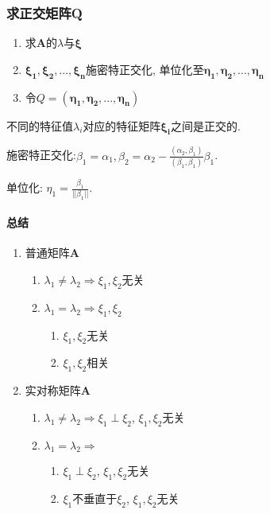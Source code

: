 \documentclass[oneside, onecolumn]{ctexbook}
\begin{document}
\subsubsection{求正交矩阵Q}
\begin{enumerate}
	\item 求$ \bm{A} $的$ \lambda $与$ \bm{\xi} $
	\item $ \bm{\xi_1}, \bm{\xi_{2}},... ,\bm{\xi_{n}} $施密特正交化, 单位化至$ \bm{\eta_{1}}, \bm{\eta_{2}},... ,\bm{\eta_{n}} $
	\item 令$ Q=(\bm{\eta_1}, \bm{\eta_2},... ,\bm{\eta_{n}}) $
\end{enumerate}
\par 不同的特征值$ \lambda_{i} $对应的特征矩阵$ \bm{\xi_{i}} $之间是正交的.
\par 施密特正交化:$ \beta_{1}=\alpha_{1}, 
\beta_{2}=\alpha_{2}-\frac{(\alpha_{2}, \beta_{1})}{(\beta_{1}, \beta_{1})}\beta_{1} $.
\par 单位化: $ \eta_{1}=\frac{\beta_{1}}{||\beta_{1}||} $.
\paragraph{总结} 
\begin{enumerate}
	\item 普通矩阵$ \bm{A} $
	\begin{enumerate}
		\item $ \lambda_{1}\neq \lambda_{2}\Rightarrow \xi_{1}, \xi_{2}$无关
		\item $ \lambda_{1}= \lambda_{2}\Rightarrow \xi_{1}, \xi_{2}$
		\begin{enumerate}
			\item $\xi_{1}, \xi_{2}$无关
			\item $\xi_{1}, \xi_{2}$相关
		\end{enumerate}
	\end{enumerate}
    \item 实对称矩阵$ \bm{A} $
    \begin{enumerate}
    	\item $ \lambda_{1}\neq \lambda_{2}\Rightarrow \xi_{1}\perp \xi_{2}$, $\xi_{1}, \xi_{2}$无关
    	\item $ \lambda_{1}= \lambda_{2}\Rightarrow$ 
    	\begin{enumerate}
    		\item $\xi_{1}\perp \xi_{2}$, $\xi_{1}, \xi_{2}$无关
    		\item $\xi_{1}$不垂直于$\xi_{2}$, $\xi_{1}, \xi_{2}$无关
    	\end{enumerate}
    \end{enumerate}
\end{enumerate}
\end{document}
